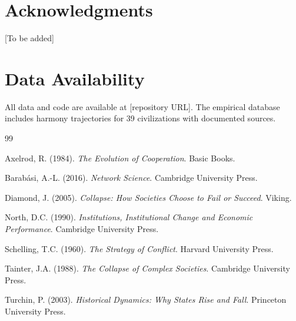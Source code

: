\documentclass[11pt,a4paper]{article}
\begin{document}
\section*{Acknowledgments}
[To be added]

\section*{Data Availability}
All data and code are available at [repository URL]. The empirical database includes harmony trajectories for 39 civilizations with documented sources.


\begin{thebibliography}{99}

Axelrod, R. (1984). \textit{The Evolution of Cooperation}. Basic Books.

Barab{\'a}si, A.-L. (2016). \textit{Network Science}. Cambridge University Press.

Diamond, J. (2005). \textit{Collapse: How Societies Choose to Fail or Succeed}. Viking.

North, D.C. (1990). \textit{Institutions, Institutional Change and Economic Performance}. Cambridge University Press.

Schelling, T.C. (1960). \textit{The Strategy of Conflict}. Harvard University Press.

Tainter, J.A. (1988). \textit{The Collapse of Complex Societies}. Cambridge University Press.

Turchin, P. (2003). \textit{Historical Dynamics: Why States Rise and Fall}. Princeton University Press.

\end{thebibliography}
\end{document}

